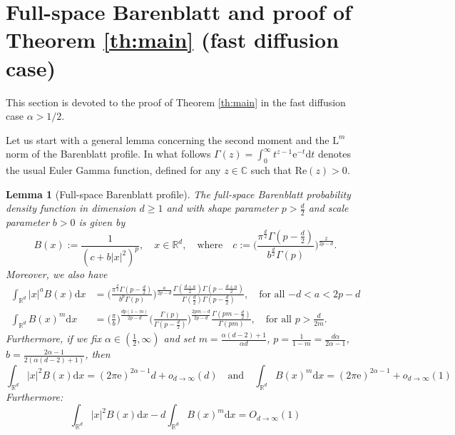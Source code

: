 \documentclass[10pt,reqno]{amsart}
\numberwithin{equation}{section}
\newtheorem{lemma}[theorem]{Lemma}%
\begin{document}
\section{Full-space Barenblatt and proof of Theorem \ref{th:main} (fast diffusion case)}

This section is devoted to the proof of Theorem \ref{th:main} in the fast diffusion case $\alpha>1/2$.

Let us start with a general lemma concerning the second moment and the $\mathrm{L}^m$ norm of the Barenblatt profile. In what follows $\Gamma(z)=\int_0^\infty t^{z-1}\mathrm{e}^{-t}\mathrm{d}t$ denotes the usual Euler Gamma function, defined for any $z\in\mathbb{C}$ such that $\mathrm{Re}(z)>0$.
\begin{lemma}[Full-space Barenblatt profile]\label{le:Bm<1}
 The full-space Barenblatt probability density function in dimension $d\geq1$ and with shape parameter $p>\frac{d}{2}$ and scale parameter $b>0$ is given by
 \begin{equation}\label{eq:Bxc}
   B(x):=\frac{1}{{(c+b|x|^2)}^p},\quad x\in\mathbb{R}^d,\quad\text{where}\quad
   c:=\Bigr(\frac{\pi^{\frac{d}{2}}\Gamma(p-\frac{d}{2})}{b^{\frac{d}{2}}\Gamma(p)}\Bigr)^{\frac{2}{2p-d}}.
 \end{equation}
 Moreover, we also have
 \begin{align}
   \int_{\mathbb{R}^d}|x|^aB(x)\mathrm{d}x
   &=\Bigr(\frac{\pi^{\frac{d}{2}}\Gamma(p-\frac{d}{2})}{b^{p}\Gamma(p)}\Bigr)^{\frac{a}{2p-d}}
   \frac{\Gamma(\frac{d+a}{2})\Gamma(p-\frac{d+a}{2})}{\Gamma(\frac{d}{2})\Gamma(p-\frac{d}{2})},
   \quad\text{for all $-d<a<2p-d$}\label{eq:Bac}\\
   \int_{\mathbb{R}^d}B(x)^m\mathrm{d}x&=\Bigr(\frac{\pi}{b}\Bigr)^{\frac{dp(1-m)}{2p-d}}
    \Bigr(\frac{\Gamma(p)}{\Gamma(p-\frac{d}{2})}\Bigr)^{\frac{2pm-d}{2p-d}}
    \frac{\Gamma\left (pm-\frac{d}{2}\right)}{\Gamma(pm)},\quad\text{for all $p>\frac{d}{2m}$}\label{eq:Bm}.
 \end{align}
 Furthermore, if we fix $\alpha\in\left(\frac{1}{2},\infty\right)$ and set $m=\frac{\alpha(d-2)+1}{\alpha d}$, $p=\frac{1}{1-m}=\frac{d\alpha}{2\alpha - 1}$, $b=\frac{2\alpha-1}{2(\alpha(d-2)+1)}$, then   
 \begin{equation}\label{eq:M2sim}
\int_{\mathbb{R}^d}|x|^2 B(x)\mathrm{d}x =(2\pi\mathrm{e})^{2\alpha-1} d + o_{d\rightarrow\infty} (d)\quad\mbox{and}\quad \int_{\mathbb{R}^d}B(x)^m\mathrm{d}x=\left(2\pi\mathrm{e}\right)^{2\alpha-1} + o_{d\rightarrow\infty}(1)
\end{equation}
Furthermore: 
\begin{equation}\label{difference-fde}
    \int_{\mathbb{R}^d}|x|^2 B(x)\mathrm{d}x - d \int_{\mathbb{R}^d}B(x)^m\mathrm{d}x = O_{d\to\infty}(1)
\end{equation}
\end{lemma}
\end{document}
